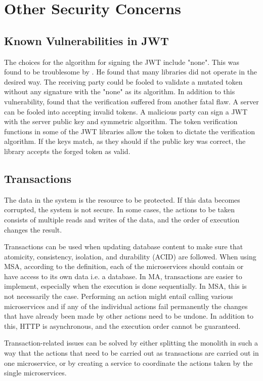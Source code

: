 \section{Other Security Concerns}
\subsection{Known Vulnerabilities in JWT}
\begin{sloppypar}
    The choices for the algorithm for signing the JWT include "none". This was
    found to be troublesome by \citet{nonejwt}. He found that many libraries did
    not operate in the desired way. The receiving party could be fooled to
    validate a mutated token without any signature with the "none" as its
    algorithm. In addition to this vulnerability, \citet{nonejwt} found that the
    verification suffered from another fatal flaw. A server can be fooled into
    accepting invalid tokens. A malicious party can sign a JWT with the server
    public key and symmetric algorithm. The token verification functions in some
    of the JWT libraries allow the token to dictate the verification algorithm.
    If the keys match, as they should if the public key was correct, the library
    accepts the forged token as valid.
\end{sloppypar}

\subsection{Transactions}
\begin{sloppypar}
    The data in the system is the resource to be protected. If this data becomes
    corrupted, the system is not secure. In some cases, the actions to be taken
    consists of multiple reads and writes of the data, and the order of
    execution changes the result.
\end{sloppypar}
\begin{sloppypar}
    Transactions can be used when updating database content to make sure that
    atomicity, consistency, isolation, and durability (ACID) \citep{acid} are
    followed. When using MSA, according to the definition, each of the
    microservices should contain or have access to its own data i.e. a database.
    In MA, transactions are easier to implement, especially when the execution
    is done sequentially. In MSA, this is not necessarily the case. Performing
    an action might entail calling various microservices and if any of the
    individual actions fail permanently the changes that have already been made
    by other actions need to be undone. In addition to this, HTTP is
    asynchronous, and the execution order cannot be guaranteed.
\end{sloppypar}
\begin{sloppypar}
    Transaction-related issues can be solved by either splitting the monolith in
    such a way that the actions that need to be carried out as transactions are
    carried out in one microservice, or by creating a service to coordinate the
    actions taken by the single microservices.
\end{sloppypar}

